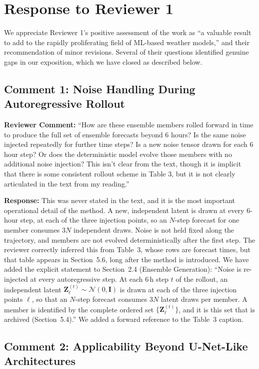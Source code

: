 \documentclass[12pt]{article}
\begin{document}
\section*{Response to Reviewer 1}

We appreciate Reviewer 1's positive assessment of the work as ``a valuable result to
add to the rapidly proliferating field of ML-based weather models,'' and their
recommendation of minor revisions. Several of their questions identified genuine gaps
in our exposition, which we have closed as described below.

\subsection*{Comment 1: Noise Handling During Autoregressive Rollout}

\textbf{Reviewer Comment:} ``How are these ensemble members rolled forward in time to
produce the full set of ensemble forecasts beyond 6 hours? Is the same noise injected
repeatedly for further time steps? Is a new noise tensor drawn for each 6 hour step?
Or does the deterministic model evolve those members with no additional noise
injection? This isn't clear from the text, though it is implicit that there is some
consistent rollout scheme in Table 3, but it is not clearly articulated in the text
from my reading.''

\textbf{Response:} This was never stated in the text, and it is the most important
operational detail of the method. A new, independent latent
is drawn at every 6-hour step, at each of the three injection points, so an $N$-step
forecast for one member consumes $3N$ independent draws. Noise is not held fixed along
the trajectory, and members are not evolved deterministically after the first step.
The reviewer correctly inferred this from Table~3, whose rows are forecast times,
but that table appears in Section~5.6, long after the method is introduced. We have
added the explicit statement to Section~2.4 (Ensemble Generation): ``Noise is
re-injected at every autoregressive step. At each 6\,h step $t$ of the rollout, an
independent latent $\mathbf{Z}_\ell^{(t)} \sim \mathcal{N}(0,\mathbf{I})$ is drawn at
each of the three injection points $\ell$, so that an $N$-step forecast consumes $3N$
latent draws per member. A member is identified by the complete ordered set
$\{\mathbf{Z}_\ell^{(t)}\}$, and it is this set that is archived (Section~5.4).'' We
added a forward reference to the Table~3 caption.

\subsection*{Comment 2: Applicability Beyond U-Net-Like Architectures}
\end{document}
